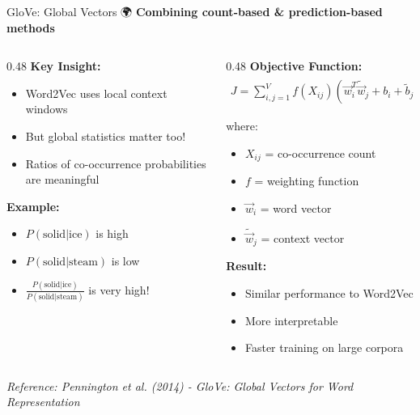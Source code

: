 \documentclass[aspectratio=169]{beamer}
\begin{document}
\begin{frame}[shrink=10]{GloVe: Global Vectors 🌍}
\textbf{Combining count-based \& prediction-based methods}

\vspace{1em}

\begin{columns}[T]
\begin{column}{0.48\textwidth}
\textbf{Key Insight:}
\begin{itemize}\setlength{\itemsep}{0pt}
    \item Word2Vec uses local context windows
    \item But global statistics matter too!
    \item Ratios of co-occurrence probabilities are meaningful
\end{itemize}

\vspace{0.5em}
\textbf{Example:}
\begin{itemize}\setlength{\itemsep}{0pt}
    \item $P(\text{solid}|\text{ice})$ is high
    \item $P(\text{solid}|\text{steam})$ is low
    \item $\frac{P(\text{solid}|\text{ice})}{P(\text{solid}|\text{steam})}$ is very high!
\end{itemize}
\end{column}

\begin{column}{0.48\textwidth}
\textbf{Objective Function:}
\begin{align*}
J = \sum_{i,j=1}^{V} f(X_{ij}) (\vec{w}_i^T \tilde{\vec{w}}_j + b_i + \tilde{b}_j - \log X_{ij})^2
\end{align*}

where:
\begin{itemize}\setlength{\itemsep}{0pt}
    \item $X_{ij}$ = co-occurrence count
    \item $f$ = weighting function
    \item $\vec{w}_i$ = word vector
    \item $\tilde{\vec{w}}_j$ = context vector
\end{itemize}

\vspace{0.5em}
\textbf{Result:}
\begin{itemize}\setlength{\itemsep}{0pt}
    \item Similar performance to Word2Vec
    \item More interpretable
    \item Faster training on large corpora
\end{itemize}
\end{column}
\end{columns}

\vspace{0.5em}
\small
\textit{Reference: Pennington et al. (2014) - GloVe: Global Vectors for Word Representation}
\end{frame}
\end{document}
